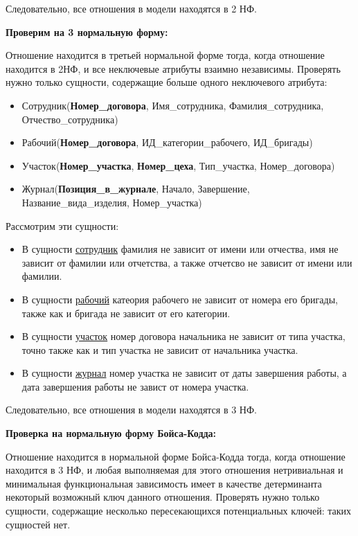Следовательно, все отношения в модели находятся в 2 НФ.

{\bf Проверим на 3 нормальную форму:}

Отношение находится в третьей нормальной форме тогда, когда отношение находится в 2НФ, и все неключевые атрибуты взаимно независимы.
Проверять нужно только сущности, содержащие больше одного неключевого атрибута:

\begin{itemize}

    \item Сотрудник({\bf Номер\_договора}, Имя\_сотрудника, Фамилия\_сотрудника, Отчество\_сотрудника)
    \item Рабочий({\bf Номер\_договора}, ИД\_категории\_рабочего, ИД\_бригады)
    \item Участок({\bf Номер\_участка}, {\bf Номер\_цеха}, Тип\_участка, Номер\_договора)
    \item Журнал({\bf Позиция\_в\_журнале}, Начало, Завершение, Название\_вида\_изделия, Номер\_участка)
\end{itemize}

Рассмотрим эти сущности:

\begin{itemize}
    \item В сущности \underline{сотрудник} фамилия не зависит от имени или отчества, имя не зависит от фамилии или отчетства, а также отчетсво не зависит от имени или фамилии.

    \item В сущности \underline{рабочий} катеория рабочего не зависит от номера его бригады, также как и бригада не зависит от его категории.

    \item В сущности \underline{участок} номер договора начальника не зависит от типа участка, точно также как и тип участка не зависит от начальника участка.

    \item В сущности \underline{журнал} номер участка не зависит от даты завершения работы, а дата завершения работы не завист от номера участка.

\end{itemize}

Следовательно, все отношения в модели находятся в 3 НФ.

{\bf Проверка на нормальную форму Бойса-Кодда:}

Отношение находится в нормальной форме Бойса-Кодда тогда, когда отношение находится в 3 НФ, и любая выполняемая для этого отношения нетривиальная и минимальная функциональная зависимость имеет в качестве детерминанта некоторый возможный ключ данного отношения.
Проверять нужно только сущности, содержащие несколько пересекающихся потенциальных ключей: таких сущностей нет.

